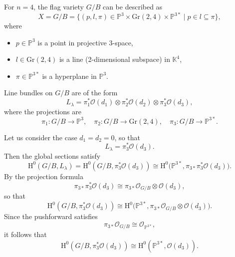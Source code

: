 \documentclass{amsart}
\begin{document}
\begin{example}
For \( n = 4 \), the flag variety \( G/B \) can be described as
\[
X = G/B = \{ (p, l, \pi) \in \mathbb{P}^3 \times \mathrm{Gr}(2,4) \times \mathbb{P}^{3*} \mid p \in l \subseteq \pi \},
\]
where
\begin{itemize}
    \item \( p \in \mathbb{P}^3 \) is a point in projective 3-space,
    \item \( l \in \mathrm{Gr}(2,4) \) is a line (2-dimensional subspace) in \( \mathbb{K}^4 \),
    \item \( \pi \in \mathbb{P}^{3*} \) is a hyperplane in \( \mathbb{P}^3 \).
\end{itemize}

Line bundles on \( G/B \) are of the form
\[
L_{\lambda} = \pi_1^* \mathcal{O}(d_1) \otimes \pi_2^* \mathcal{O}(d_2) \otimes \pi_3^* \mathcal{O}(d_3),
\]
where the projections are
\[
\pi_1: G/B \to \mathbb{P}^3, \quad \pi_2: G/B \to \mathrm{Gr}(2,4), \quad \pi_3: G/B \to \mathbb{P}^{3*}.
\]

Let us consider the case \( d_1 = d_2 = 0 \), so that
\[
L_{\lambda} = \pi_3^* \mathcal{O}(d_3).
\]
Then the global sections satisfy
\[
\mathrm{H}^0(G/B, L_{\lambda}) = \mathrm{H}^0(G/B, \pi_3^* \mathcal{O}(d_3)) \cong \mathrm{H}^0\big(\mathbb{P}^{3*}, \pi_{3*} \pi_3^* \mathcal{O}(d_3)\big).
\]
By the projection formula
\[
\pi_{3*} \pi_3^* \mathcal{O}(d_3) \cong \pi_{3*} \mathcal{O}_{G/B} \otimes \mathcal{O}(d_3),
\]
so that
\[
\mathrm{H}^0(G/B, \pi_3^* \mathcal{O}(d_3)) \cong \mathrm{H}^0\big(\mathbb{P}^{3*}, \pi_{3*} \mathcal{O}_{G/B} \otimes \mathcal{O}(d_3)\big).
\]
Since the pushforward satisfies
\[
\pi_{3*} \mathcal{O}_{G/B} \cong \mathcal{O}_{\mathbb{P}^{3*}},
\]
it follows that
\[
\mathrm{H}^0(G/B, \pi_3^* \mathcal{O}(d_3)) \cong \mathrm{H}^0(\mathbb{P}^{3*}, \mathcal{O}(d_3)).
\] 
\end{example}
\end{document}
